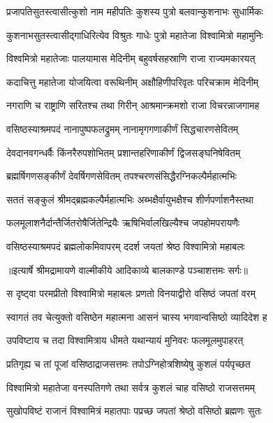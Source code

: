 \twolineshloka
{प्रजापतिसुतस्त्वासीत्कुशो नाम महीपतिः}
{कुशस्य पुत्रो बलवान्कुशनाभः सुधार्मिकः} %

\twolineshloka
{कुशनाभसुतस्त्वासीद्गाधिरित्येव विश्रुतः}
{गाधेः पुत्रो महातेजा विश्वामित्रो महामुनिः} %

\twolineshloka
{विश्वमित्रो महातेजाः पालयामास मेदिनीम्}
{बहुवर्षसहस्राणि राजा राज्यमकारयत्} %

\twolineshloka
{कदाचित्तु महातेजा योजयित्वा वरूथिनीम्}
{अक्षौहिणीपरिवृतः परिचक्राम मेदिनीम्} %

\twolineshloka
{नगराणि च राष्ट्राणि सरितश्च तथा गिरीन्}
{आश्रमान्क्रमशो राजा विचरन्नाजगामह} %

\twolineshloka
{वसिष्ठस्याश्रमपदं नानापुष्पफलद्रुमम्}
{नानामृगगणाकीर्णं सिद्धचारणसेवितम्} %

\twolineshloka
{देवदानवगन्धर्वैः किंनरैरुपशोभितम्}
{प्रशान्तहरिणाकीर्णं द्विजसङ्घनिषेवितम्} %

\twolineshloka
{ब्रह्मर्षिगणसङ्कीर्णं देवर्षिगणसेवितम्}
{तपश्चरणसंसिद्धैरग्निकल्पैर्महात्मभिः} %

\twolineshloka
{सततं सङ्कुलं श्रीमद्ब्रह्मकल्पैर्महात्मभिः}
{अब्भक्षैर्वायुभक्षैश्च शीर्णपर्णाशनैस्तथा} %

\twolineshloka
{फलमूलाशनैर्दान्तैर्जितरोषैर्जितेन्द्रियैः}
{ऋषिभिर्वालखिल्यैश्च जपहोमपरायणैः} %

\twolineshloka
{वसिष्ठस्याश्रमपदं ब्रह्मलोकमिवापरम्}
{ददर्श जयतां श्रेष्ठ विश्वामित्रो महाबलः} %


{॥इत्यार्षे श्रीमद्रामायणे वाल्मीकीये आदिकाव्ये बालकाण्डे पञ्चाशत्तमः सर्गः॥}


\twolineshloka
{स दृष्ट्वा परमप्रीतो विश्वामित्रो महाबलः}
{प्रणतो विनयाद्वीरो वसिष्ठं जपतां वरम्} %

\twolineshloka
{स्वागतं तव चेत्युक्तो वसिष्ठेन महात्मना}
{आसनं चास्य भगवान्वसिष्ठो व्यादिदेश ह} %

\twolineshloka
{उपविष्टाय च तदा विश्वामित्राय धीमते}
{यथान्यायं मुनिवरः फलमूलमुपाहरत्} %

\twolineshloka
{प्रतिगृह्य च तां पूजां वसिष्ठाद्राजसत्तमः}
{तपोऽग्निहोत्रशिष्येषु कुशलं पर्यपृच्छत} %

\twolineshloka
{विश्वामित्रो महातेजा वनस्पतिगणे तथा}
{सर्वत्र कुशलं चाह वसिष्ठो राजसत्तमम्} %

\twolineshloka
{सुखोपविष्टं राजानं विश्वामित्रं महातपाः}
{पप्रच्छ जपतां श्रेष्ठो वसिष्ठो ब्रह्मणः सुतः} %

